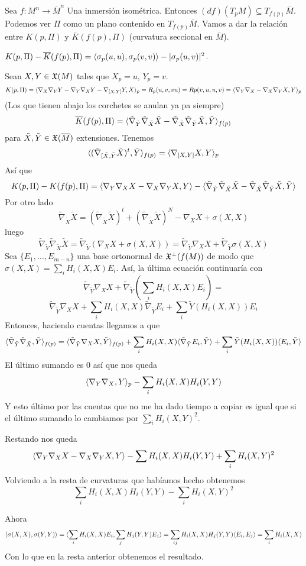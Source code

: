 \documentclass[GSR.tex]{subfiles}
\begin{document}
Sea $f:M^n\to\overline{M}^n$ Una inmersión isométrica. Entonces $(df)(T_pM)\subseteq T_{f(p)}\overline{M}$. Podemos ver $\Pi$ como un plano contenido en $T_{f(p)}\overline{M}$. Vamos a dar la relación entre $K(p,\Pi)$ y $\overline{K}(f(p),\Pi)$ (curvatura seccional en $\overline{M}$). 

\begin{teorema}[de Gauss]
$K(p,\Pi)-\overline{K}(f(p),\Pi)=\langle{\sigma_p(u,u),\sigma_p(v,v)}\rangle-|\sigma_p(u,v)|^2$. 
\end{teorema}
\begin{dem}
Sean $X,Y\in{\mathfrak{X}}(M)$ tales que $X_p=u$, $Y_p=v$. 
\[
K(p,\Pi)=\langle{\nabla_X\nabla_YY-\nabla_Y\nabla_XY-\nabla_{[X,Y]}Y,X}\rangle_p=R_p(u,v,vu)=Rp(v,u,u,v)=\langle{\nabla_Y\nabla_X-\nabla_X\nabla_YX,Y}\rangle_p
\]
(Los que tienen abajo los corchetes se anulan ya pa siempre)
\[
\overline{K}(f(p),\Pi)=\langle{\tilde{\nabla}_{\tilde{Y}}\tilde{\nabla}_{\tilde{X}}\tilde{X}-\tilde{\nabla}_{\tilde{X}}\tilde{\nabla}_{\tilde{Y}}\tilde{X},\tilde{Y}}\rangle_{f(p)}
\]
para $\tilde{X},\tilde{Y}\in{\mathfrak{X}}(\overline{M})$ extensiones. Tenemos
\[
\langle{(\tilde{\nabla}_{[\tilde{X},\tilde{Y}}\tilde{X})^t,\tilde{Y}}\rangle_{f(p)}=\langle{\nabla_{[X,Y]}X,Y}\rangle_p
\]
Así que
\[
K(p,\Pi)-K(f(p),\Pi)=\langle{\nabla_Y\nabla_X X-\nabla_X\nabla_YX,Y}\rangle-\langle{\tilde{\nabla}_{\tilde{Y}}\tilde{\nabla}_{\tilde{X}}\tilde{X}-\tilde{\nabla}_{\tilde{X}}\tilde{\nabla}_{\tilde{Y}}\tilde{X},\tilde{Y}}\rangle
\]
Por otro lado
\[
\tilde{\nabla}_{\tilde{X}}\tilde{X}=(\tilde{\nabla}_{\tilde{X}}\tilde{X})^t+(\tilde{\nabla}_{\tilde{X}}\tilde{X})^N-\nabla_XX+\sigma(X,X)
\]
luego
\[
\tilde{\nabla}_{\tilde{Y}}\tilde{\nabla}_{\tilde{X}}\tilde{X}=\tilde{\nabla}_{\tilde{Y}}(\nabla_XX+\sigma(X,X))=\tilde{\nabla}_{\tilde{Y}}\nabla_XX+\tilde{\nabla}_{\tilde{Y}}\sigma(X,X)
\]
Sea $\{E_1,\dots, E_{m-n}\}$ una base ortonormal de ${\mathfrak{X}}^\perp(f(M))$ de modo que $\sigma(X,X)=\sum_iH_i(X,X)E_i$. Así, la última ecuación continuaría con
\[
\tilde{\nabla}_{\tilde{Y}}\nabla_XX+\tilde{\nabla}_{\tilde{Y}}(\sum_iH_i(X,X)E_i)=
\]
\[
\tilde{\nabla}_{\tilde{Y}}\nabla_XX+\sum_iH_i(X,X)\tilde{\nabla}_{\tilde{Y}}E_i+\sum_i\tilde{Y}(H_i(X,X))E_i
\]
Entonces, haciendo cuentas llegamos a que
\[
\langle{\tilde{\nabla}_{\tilde{Y}}\tilde{\nabla}_{\tilde{X}},\tilde{Y}}\rangle_{f(p)}=\langle{\tilde{\nabla}_{\tilde{Y}}\nabla_XX,\tilde{Y}}\rangle_{f(p)}+\sum_iH_i(X,X)\langle{\tilde{\nabla}_{\tilde{Y}}E_i,\tilde{Y}}\rangle+\sum_i\tilde{Y}(H_i(X,X))\langle{E_i,\tilde{Y}}\rangle
\]
El último sumando es 0 así que nos queda
\[
\langle{\nabla_Y\nabla_X,Y}\rangle_p-\sum_iH_i(X,X)H_i(Y,Y)
\]
Y esto último por las cuentas que no me ha dado tiempo a copiar es igual que si el último sumando lo cambiamos por $\sum_iH_i(X,Y)^2$. 

Restando nos queda
\[
\langle{\nabla_Y\nabla_XX-\nabla_X\nabla_YX,Y}\rangle-\sum H_i(X,X)H_i(Y,Y)+\sum_i H_i(X,Y)^2
\]
Volviendo a la resta de curvaturas que habíamos hecho obtenemos
\[
\sum_i H_i(X,X)H_i(Y,Y)-\sum_i H_i(X,Y)^2
\]

Ahora
\[
\langle{\sigma(X,X),\sigma(Y,Y)}\rangle=\langle{\sum_i H_i(X,X)E_i,\sum_jH_j(Y,Y)E_j}\rangle=\sum_{ij}H_i(X,X)H_j(Y,Y)\langle{E_i,E_j}\rangle=\sum_iH_i(X,X)
\]
Con lo que en la resta anterior obtenemos el resultado.

\end{dem}
\end{document}
